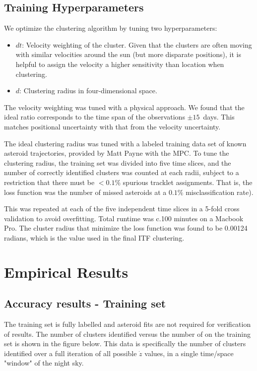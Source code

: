 \documentclass[11pt,letter]{article}
\begin{document}
    \subsection{Training Hyperparameters}
We optimize the clustering algorithm by tuning two hyperparameters:
\begin{itemize}
    \item $dt$: Velocity weighting of the cluster.  Given that the clusters are often moving with similar velocities around the sun (but more disparate positions), it is helpful to assign the velocity a higher sensitivity than location when clustering.  
    \item $d$: Clustering radius in four-dimensional space.
\end{itemize}
The velocity weighting was tuned with a physical approach.  We found that the ideal ratio corresponds to the time span of the observations $\pm 15$~days.   This matches positional uncertainty with that from the velocity uncertainty.

The ideal clustering radius was tuned with a labeled training data set of known asteroid trajectories, provided by Matt Payne with the MPC.  \newline
To tune the clustering radius, the training set was divided into five time slices, and the number of correctly identified clusters was counted at each radii, subject to a restriction that there must be $<0.1\%$ spurious tracklet assignments.  That is, the loss function was the number of missed asteroids at a $ 0.1\%$ misclassification rate).

This was repeated at each of the five independent time slices in a 5-fold cross validation to avoid overfitting.  Total runtime was c.100 minutes on a Macbook Pro.  The cluster radius that minimize the loss function was found to be 0.00124 radians, which is the value used in the final ITF clustering.

\section*{Empirical Results}
\subsection*{Accuracy results - Training set}
The training set is fully labelled and asteroid fits are not required for verification of results.\newline
The number of clusters identified versus the number of on the training set is shown in the figure below.  This data is specifically the number of clusters identified over a full iteration of all possible $\dot{z}$ values, in a single time/space "window" of the night sky.
\end{document}
